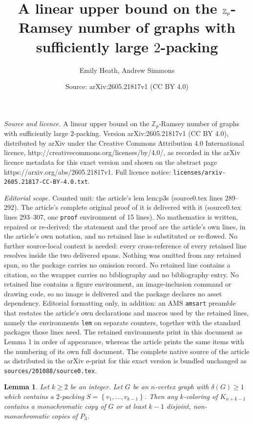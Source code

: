 \documentclass[10pt,a4paper]{amsart}
\title{A linear upper bound on the $\bZ_p$-Ramsey number of graphs with sufficiently large $2$-packing}
\author{Emily Heath, Andrew Simmons}
\date{Source: arXiv:2605.21817v1 (CC BY 4.0)}
\newcommand{\bZ}{\mathbb{Z}}
\newtheorem{lem}{Lemma}
\newcommand\set[1]{\left\{ #1 \right\}}
\begin{document}
\maketitle

\noindent\emph{Source and licence.} A linear upper bound on the $\bZ_p$-Ramsey number of graphs with sufficiently large $2$-packing. Version arXiv:2605.21817v1 (CC BY 4.0), distributed by arXiv under the Creative Commons Attribution 4.0 International licence, http://creativecommons.org/licenses/by/4.0/, as recorded in the arXiv licence metadata for this exact version and shown on the abstract page https://arxiv.org/abs/2605.21817v1. Full licence notice: \texttt{licenses/arxiv-2605.21817-CC-BY-4.0.txt}.\par\smallskip

\noindent\textit{Editorial scope.} Counted unit: the article's lem lem:p3s (source0.tex lines 289--292). The article's complete original proof of it is delivered with it (source0.tex lines 293--307, one \texttt{proof} environment of 15 lines). No mathematics is written, repaired or re-derived: the statement and the proof are the article's own lines, in the article's own notation, and no retained line is substituted or re-flowed.  No further source-local context is needed: every cross-reference of every retained line resolves inside the two delivered spans.  Nothing was omitted from any retained span, so the package carries no omission record.  No retained line contains a citation, so the wrapper carries no bibliography and no bibliography entry.  No retained line contains a figure environment, an image-inclusion command or drawing code, so no image is delivered and the package declares no asset dependency.  Editorial formatting only, in addition: an AMS \texttt{amsart} preamble that restates the article's own declarations and macros used by the retained lines, namely the environments \texttt{lem} on separate counters, together with the standard packages those lines need.  The retained environments print in this document as Lemma 1 in order of appearance, whereas the article prints the same items with the numbering of its own full document.  The complete native source of the article as distributed in the arXiv e-print for this exact version is bundled unchanged as \texttt{sources/201088/source0.tex}.
\begin{lem}
    Let $k\geq 2$ be an integer. Let $G$ be an $n$-vertex graph with $\delta(G)\geq 1$ which contains a $2$-packing $S=\set{v_1,\ldots,v_{k-1}}$. Then any $k$-coloring of $K_{n+k-1}$ contains a monochromatic copy of $G$ or at least $k-1$ disjoint, non-monochromatic copies of $P_3$.
    \label{lem:p3s}
\end{lem}
\end{document}
